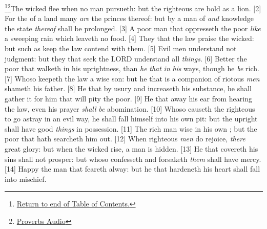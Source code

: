 \footnote{\textcolor[cmyk]{0.99998,1,0,0}{\hyperlink{TOC}{Return to end of Table of Contents.}}}\footnote{\href{https://www.audioverse.org/english/audiobibles/books/ENGKJV/O/Prov/1}{\textcolor[cmyk]{0.99998,1,0,0}{Proverbs Audio}}}\textcolor[cmyk]{0.99998,1,0,0}{The wicked flee when no man pursueth: but the righteous are bold as a lion.}
[2] \textcolor[cmyk]{0.99998,1,0,0}{For the  of a land many \emph{are} the princes thereof: but by a man of  \emph{and} knowledge the state \emph{thereof} shall be prolonged.}
[3] \textcolor[cmyk]{0.99998,1,0,0}{A poor man that oppresseth the poor  \emph{like} a sweeping rain which leaveth no food.}
[4] \textcolor[cmyk]{0.99998,1,0,0}{They that  the law praise the wicked: but such as keep the law contend with them.}
[5] \textcolor[cmyk]{0.99998,1,0,0}{Evil men understand not judgment: but they that seek the LORD understand all \emph{things}.}
[6] \textcolor[cmyk]{0.99998,1,0,0}{Better  the poor that walketh in his uprightness, than \emph{he} \emph{that}   \emph{in} \emph{his} ways, though he \emph{be} rich.}
[7] \textcolor[cmyk]{0.99998,1,0,0}{Whoso keepeth the law  a wise son: but he that is a companion of riotous \emph{men} shameth his father.}
[8] \textcolor[cmyk]{0.99998,1,0,0}{He that by usury and  increaseth his substance, he shall gather it for him that will pity the poor.}
[9] \textcolor[cmyk]{0.99998,1,0,0}{He that  away his ear from hearing the law, even his prayer \emph{shall} \emph{be} abomination.}
[10] \textcolor[cmyk]{0.99998,1,0,0}{Whoso causeth the righteous to go astray in an evil way, he shall fall himself into his own pit: but the upright shall have good \emph{things} in possession.}
[11] \textcolor[cmyk]{0.99998,1,0,0}{The rich man  wise in his own ; but the poor that hath  searcheth him out.}
[12] \textcolor[cmyk]{0.99998,1,0,0}{When righteous \emph{men} do rejoice, \emph{there}  great glory: but when the wicked rise, a man is hidden.}
[13] \textcolor[cmyk]{0.99998,1,0,0}{He that covereth his sins shall not prosper: but whoso confesseth and forsaketh \emph{them} shall have mercy.}
[14] \textcolor[cmyk]{0.99998,1,0,0}{Happy  the man that feareth alway: but he that hardeneth his heart shall fall into mischief.}
